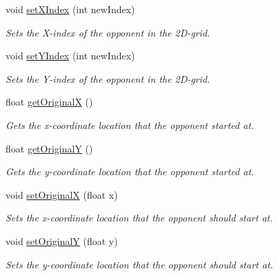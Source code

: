 \begin{DoxyCompactItemize}
void \mbox{\hyperlink{class_opponent_a09b3060f1b6679354014834ab3bcb753}{set\+X\+Index}} (int new\+Index)
\begin{DoxyCompactList}\small\item\em Sets the X-\/index of the opponent in the 2D-\/grid. \end{DoxyCompactList}\item 
\mbox{\label{class_opponent_a6b77c2017c07140b8e61849c11cbc8a5}} 
void \mbox{\hyperlink{class_opponent_a6b77c2017c07140b8e61849c11cbc8a5}{set\+Y\+Index}} (int new\+Index)
\begin{DoxyCompactList}\small\item\em Sets the Y-\/index of the opponent in the 2D-\/grid. \end{DoxyCompactList}\item 
\mbox{\label{class_opponent_ab0926a92060184ec56f113e4ea15dbf8}} 
float \mbox{\hyperlink{class_opponent_ab0926a92060184ec56f113e4ea15dbf8}{get\+OriginalX}} ()
\begin{DoxyCompactList}\small\item\em Gets the x-\/coordinate location that the opponent started at. \end{DoxyCompactList}\item 
\mbox{\label{class_opponent_affece97ea4c974ac1652e5d778f28ba7}} 
float \mbox{\hyperlink{class_opponent_affece97ea4c974ac1652e5d778f28ba7}{get\+OriginalY}} ()
\begin{DoxyCompactList}\small\item\em Gets the y-\/coordinate location that the opponent started at. \end{DoxyCompactList}\item 
\mbox{\label{class_opponent_a4f0c93f21672de8421104d4853c1f48e}} 
void \mbox{\hyperlink{class_opponent_a4f0c93f21672de8421104d4853c1f48e}{set\+OriginalX}} (float x)
\begin{DoxyCompactList}\small\item\em Sets the x-\/coordinate location that the opponent should start at. \end{DoxyCompactList}\item 
\mbox{\label{class_opponent_a420d01564fa488aa190587d501e33fe9}} 
void \mbox{\hyperlink{class_opponent_a420d01564fa488aa190587d501e33fe9}{set\+OriginalY}} (float y)
\begin{DoxyCompactList}\small\item\em Sets the y-\/coordinate location that the opponent should start at. \end{DoxyCompactList}\end{DoxyCompactItemize}
